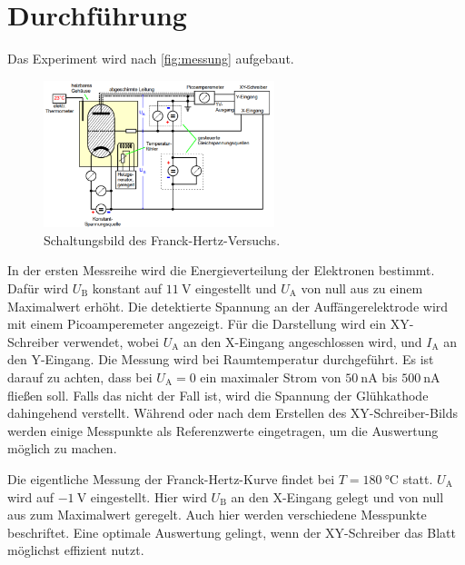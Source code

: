 \section{Durchführung}
\label{sec:Durchführung}


Das Experiment wird nach \autoref{fig:messung} aufgebaut.

\begin{figure}
    \centering
    \includegraphics[width=0.6\textwidth]{images/bild5.png}
    \caption{Schaltungsbild des Franck-Hertz-Versuchs.\cite{V601}}
    \label{fig:messung}
\end{figure}

In der ersten Messreihe wird die Energieverteilung der Elektronen bestimmt.
Dafür wird $U_\text{B}$ konstant auf $\SI{11}{\volt}$ eingestellt und $U_\text{A}$ von null aus zu einem Maximalwert erhöht.
Die detektierte Spannung an der Auffängerelektrode wird mit einem Picoamperemeter angezeigt.
Für die Darstellung wird ein XY-Schreiber verwendet, wobei $U_\text{A}$ an den X-Eingang angeschlossen wird, und $I_\text{A}$ an den Y-Eingang.
Die Messung wird bei Raumtemperatur durchgeführt.
Es ist darauf zu achten, dass bei $U_\text{A} = 0$ ein maximaler Strom von $\SI{50}{\nano\ampere}$ bis $\SI{500}{\nano\ampere}$ fließen soll. 
Falls das nicht der Fall ist, wird die Spannung der Glühkathode dahingehend verstellt.
Während oder nach dem Erstellen des XY-Schreiber-Bilds werden einige Messpunkte als Referenzwerte eingetragen, um die Auswertung möglich zu machen.

Die eigentliche Messung der Franck-Hertz-Kurve findet bei $T = \SI{180}{\celsius}$ statt.
$U_\text{A}$ wird auf $\SI{-1}{\volt}$ eingestellt.
Hier wird $U_\text{B}$ an den X-Eingang gelegt und von null aus zum Maximalwert geregelt.
Auch hier werden verschiedene Messpunkte beschriftet.
Eine optimale Auswertung gelingt, wenn der XY-Schreiber das Blatt möglichst effizient nutzt.
